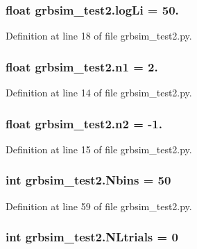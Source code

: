 \hypertarget{namespacegrbsim__test2_a9360a1849fdacc1c0d7254dd0cef2341}{
\subsubsection[{log\-Li}]{\setlength{\rightskip}{0pt plus 5cm}float grbsim\-\_\-test2.\-log\-Li = 50.}}\label{namespacegrbsim__test2_a9360a1849fdacc1c0d7254dd0cef2341}


Definition at line 18 of file grbsim\-\_\-test2.\-py.

\hypertarget{namespacegrbsim__test2_a4be2937624900a913f7611bf92990530}{
\subsubsection[{n1}]{\setlength{\rightskip}{0pt plus 5cm}float grbsim\-\_\-test2.\-n1 = 2.}}\label{namespacegrbsim__test2_a4be2937624900a913f7611bf92990530}


Definition at line 14 of file grbsim\-\_\-test2.\-py.

\hypertarget{namespacegrbsim__test2_a8b4865095db37b8e44a551be96abb247}{
\subsubsection[{n2}]{\setlength{\rightskip}{0pt plus 5cm}float grbsim\-\_\-test2.\-n2 = -\/1.}}\label{namespacegrbsim__test2_a8b4865095db37b8e44a551be96abb247}


Definition at line 15 of file grbsim\-\_\-test2.\-py.

\hypertarget{namespacegrbsim__test2_a121aab1a22022d2bb0655f8a9be95d21}{
\subsubsection[{Nbins}]{\setlength{\rightskip}{0pt plus 5cm}int grbsim\-\_\-test2.\-Nbins = 50}}\label{namespacegrbsim__test2_a121aab1a22022d2bb0655f8a9be95d21}


Definition at line 59 of file grbsim\-\_\-test2.\-py.

\hypertarget{namespacegrbsim__test2_a40b35f6e21c03593ce7f19b5b5dc56ed}{
\subsubsection[{N\-Ltrials}]{\setlength{\rightskip}{0pt plus 5cm}int grbsim\-\_\-test2.\-N\-Ltrials = 0}}\label{namespacegrbsim__test2_a40b35f6e21c03593ce7f19b5b5dc56ed}


